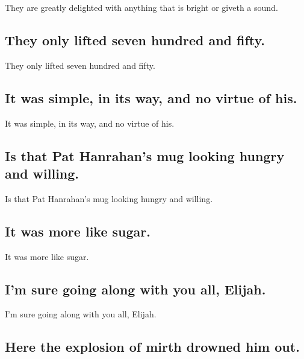 \documentclass[]{article}
\begin{document}
They are greatly delighted with anything that is bright or giveth a
sound.

\hypertarget{they-only-lifted-seven-hundred-and-fifty.}{%
\subsection{They only lifted seven hundred and
fifty.}\label{they-only-lifted-seven-hundred-and-fifty.}}

They only lifted seven hundred and fifty.

\hypertarget{it-was-simple-in-its-way-and-no-virtue-of-his.}{%
\subsection{It was simple, in its way, and no virtue of
his.}\label{it-was-simple-in-its-way-and-no-virtue-of-his.}}

It was simple, in its way, and no virtue of his.

\hypertarget{is-that-pat-hanrahans-mug-looking-hungry-and-willing.}{%
\subsection{Is that Pat Hanrahan's mug looking hungry and
willing.}\label{is-that-pat-hanrahans-mug-looking-hungry-and-willing.}}

Is that Pat Hanrahan's mug looking hungry and willing.

\hypertarget{it-was-more-like-sugar.}{%
\subsection{It was more like sugar.}\label{it-was-more-like-sugar.}}

It was more like sugar.

\hypertarget{im-sure-going-along-with-you-all-elijah.}{%
\subsection{I'm sure going along with you all,
Elijah.}\label{im-sure-going-along-with-you-all-elijah.}}

I'm sure going along with you all, Elijah.

\hypertarget{here-the-explosion-of-mirth-drowned-him-out.}{%
\subsection{Here the explosion of mirth drowned him
out.}\label{here-the-explosion-of-mirth-drowned-him-out.}}
\end{document}
